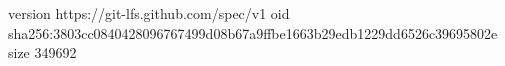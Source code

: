 version https://git-lfs.github.com/spec/v1
oid sha256:3803cc0840428096767499d08b67a9ffbe1663b29edb1229dd6526c39695802e
size 349692
